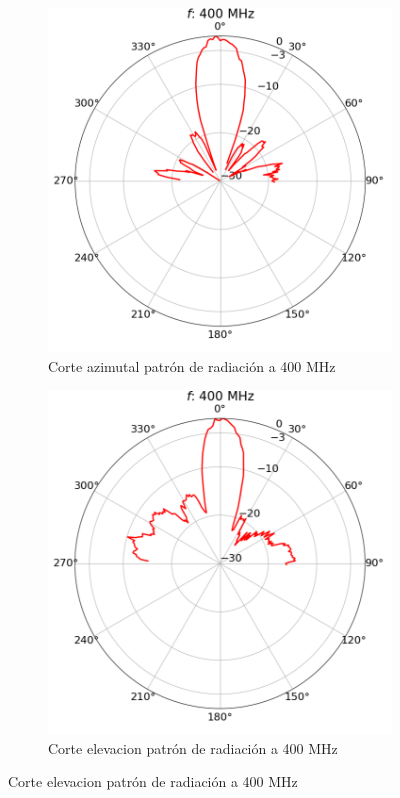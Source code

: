 \begin{figure}[h!]
    \centering
    \begin{subfigure}{0.45\textwidth}
        \includegraphics[width=\textwidth]{img/400rp}
        \caption{Corte azimutal patrón de radiación a 400 MHz}
        \label{fig:400rp}
    \end{subfigure}
    \begin{subfigure}{0.45\textwidth}
        \includegraphics[width=\textwidth]{img/400rpel}
        \caption{Corte elevacion patrón de radiación a 400 MHz}
        \label{fig:400rpel}
    \end{subfigure}
\end{figure}


